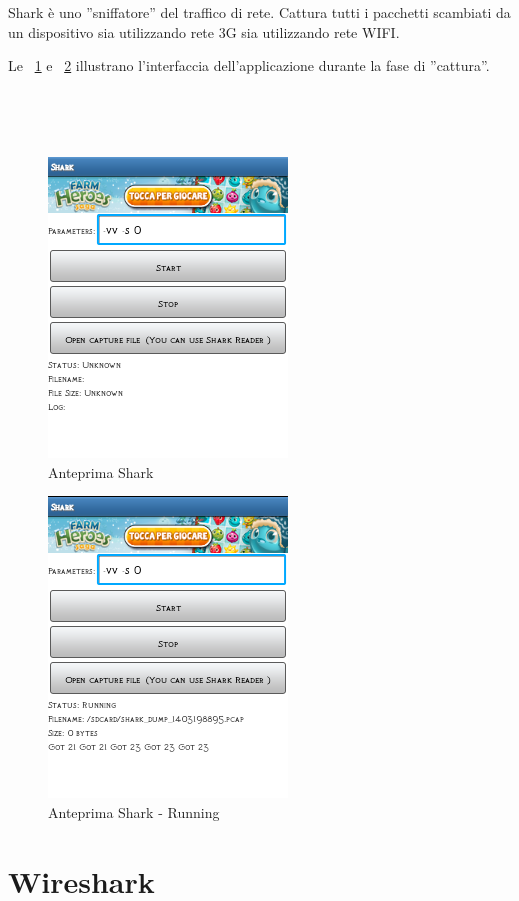 \documentclass[a4paper,11pt]{book}
\begin{document}
Shark \`e uno ''sniffatore'' del traffico di rete. Cattura tutti i pacchetti scambiati da un dispositivo sia utilizzando rete 3G sia utilizzando rete WIFI. 

Le \figurename ~\ref{fig:stop} e ~\ref{fig:go} illustrano l'interfaccia dell'applicazione durante la fase di ''cattura''.

~


~


\begin{figure}[h!t]
\centering
\includegraphics[scale = 0.8]{shark}
\caption{Anteprima Shark}
\label{fig:stop}
\end{figure}

\begin{figure}[h!t]
\centering
\includegraphics[scale = 0.8]{shark_go}
\caption{Anteprima Shark - Running}
\label{fig:go}
\end{figure}

\clearpage

\section{Wireshark}
\end{document}
